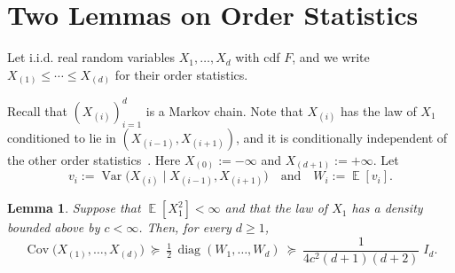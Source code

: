 \documentclass[11pt]{article}
\newtheorem{lem}[theor]{Lemma}
\theoremstyle{definition}
\DeclareMathOperator{\EX}{\mathbb{E}}
\DeclareMathOperator{\diag}{diag}
\DeclareMathOperator{\Cov}{Cov}
\begin{document}
\section{Two Lemmas on Order Statistics}
\label{app:orderstat}

Let i.i.d. real random variables
$X_1,\dots,X_d$  with cdf $F$, and we write
$X_{(1)}\le\cdots\le X_{(d)}$ for their order statistics. 

Recall that $(X_{(i)})_{i=1}^d$ is a Markov chain. Note that $X_{(i)}$ has the law of $X_1$ conditioned to lie in
$(X_{(i-1)},X_{(i+1)})$, and it is conditionally independent of the other order statistics~\cite[\S2.5]{david2003order}. Here $X_{(0)}:=-\infty$ and $X_{(d+1)}:=+\infty$. Let
\[
v_i:=\operatorname{Var}\bigl(X_{(i)}\mid X_{(i-1)},X_{(i+1)}\bigr)
\quad\text{and}\quad W_i:=\EX[v_i].
\]



\begin{lem}
	\label{lem:orderstat-floor}
	Suppose that $\EX[X_1^2]<\infty$ and that the law of $X_1$ has a density bounded
	above by $c<\infty$. Then, for every $d\ge1$,
	\[
	\Cov\bigl(X_{(1)},\dots,X_{(d)}\bigr)
	\ \succeq\ \tfrac12\,\diag(W_1,\dots,W_d)
	\ \succeq\ \frac{1}{4c^{2}(d+1)(d+2)}\;I_d .
	\]
\end{lem}
\end{document}
